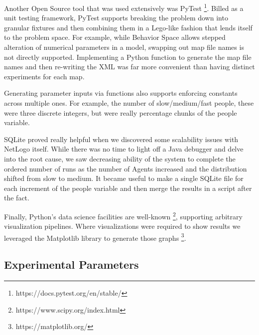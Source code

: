 \documentclass[12pt,letterpaper]{article}
\begin{document}
Another Open Source tool that was used extensively was PyTest \footnote{https://docs.pytest.org/en/stable/}. Billed as a
unit testing framework, PyTest supports breaking the problem down into granular
fixtures and then combining them in a Lego-like fashion that lends itself to the
problem space. For example, while Behavior Space allows stepped alteration of
numerical parameters in a model, swapping out map file names is not directly
supported. Implementing a Python function to generate the map file names and
then re-writing the XML was far more convenient than having distinct
experiments for each map.

Generating parameter inputs via functions also supports enforcing constants
across multiple ones. For example, the number of slow/medium/fast people, these
were three discrete integers, but were really percentage chunks of the people
variable.

SQLite proved really helpful when we discovered some scalability issues with
NetLogo itself. While there was no time to light off a Java debugger and delve
into the root cause, we saw decreasing ability of the system to complete the
ordered number of runs as the number of Agents increased and the distribution
shifted from slow to medium. It became useful to make a single SQLite file for
each increment of the people variable and then merge the results in a script
after the fact.

Finally, Python's data science facilities are well-known \footnote{https://www.scipy.org/index.html}, supporting arbitrary visualization pipelines.  Where visualizations were required to show results we leveraged the Matplotlib library to generate those graphs \footnote{ https://matplotlib.org/}.

\subsection{Experimental Parameters}
\end{document}
